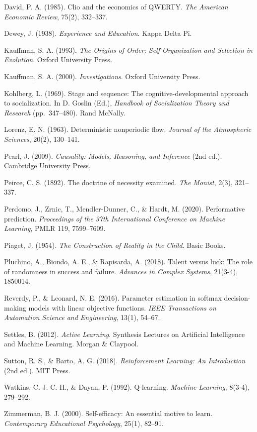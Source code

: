 \documentclass[
]{article}
\begin{document}
David, P. A. (1985). Clio and the economics of QWERTY. \emph{The
American Economic Review}, 75(2), 332--337.

Dewey, J. (1938). \emph{Experience and Education}. Kappa Delta Pi.

Kauffman, S. A. (1993). \emph{The Origins of Order: Self-Organization
and Selection in Evolution}. Oxford University Press.

Kauffman, S. A. (2000). \emph{Investigations}. Oxford University Press.

Kohlberg, L. (1969). Stage and sequence: The cognitive-developmental
approach to socialization. In D. Goslin (Ed.), \emph{Handbook of
Socialization Theory and Research} (pp.~347--480). Rand McNally.

Lorenz, E. N. (1963). Deterministic nonperiodic flow. \emph{Journal of
the Atmospheric Sciences}, 20(2), 130--141.

Pearl, J. (2009). \emph{Causality: Models, Reasoning, and Inference}
(2nd ed.). Cambridge University Press.

Peirce, C. S. (1892). The doctrine of necessity examined. \emph{The
Monist}, 2(3), 321--337.

Perdomo, J., Zrnic, T., Mendler-Dunner, C., \& Hardt, M. (2020).
Performative prediction. \emph{Proceedings of the 37th International
Conference on Machine Learning}, PMLR 119, 7599--7609.

Piaget, J. (1954). \emph{The Construction of Reality in the Child}.
Basic Books.

Pluchino, A., Biondo, A. E., \& Rapisarda, A. (2018). Talent versus
luck: The role of randomness in success and failure. \emph{Advances in
Complex Systems}, 21(3-4), 1850014.

Reverdy, P., \& Leonard, N. E. (2016). Parameter estimation in softmax
decision-making models with linear objective functions. \emph{IEEE
Transactions on Automation Science and Engineering}, 13(1), 54--67.

Settles, B. (2012). \emph{Active Learning}. Synthesis Lectures on
Artificial Intelligence and Machine Learning. Morgan \& Claypool.

Sutton, R. S., \& Barto, A. G. (2018). \emph{Reinforcement Learning: An
Introduction} (2nd ed.). MIT Press.

Watkins, C. J. C. H., \& Dayan, P. (1992). Q-learning. \emph{Machine
Learning}, 8(3-4), 279--292.

Zimmerman, B. J. (2000). Self-efficacy: An essential motive to learn.
\emph{Contemporary Educational Psychology}, 25(1), 82--91.
\end{document}
